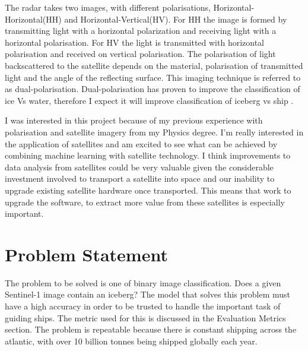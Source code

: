 \documentclass{article}
\begin{document}
The radar takes two images, with different polarisations,  Horizontal-Horizontal(HH) and Horizontal-Vertical(HV). For HH the image is formed by transmitting light with a horizontal polarization and receiving light with a horizontal polarisation. For HV the light is transmitted with horizontal polarisation and received on vertical polarisation. The polarisation of light backscattered to the satellite depends on the material, polarisation of transmitted light and the angle of the reflecting surface. This imaging technique is referred to as dual-polarisation. Dual-polarisation has proven to improve the classification of ice Vs water, therefore I expect it will improve classification of iceberg vs ship \cite{radarsat-mode-selection,yu}. 

I was interested in this project because of my previous experience with polarisation and satellite imagery from my Physics degree. I'm really interested in the application of satellites and am excited to see what can be achieved by combining machine learning with satellite technology. I think improvements to data analysis from satellites could be very valuable given the considerable investment involved to transport a satellite into space and our inability to upgrade existing satellite hardware once transported. This means that work to upgrade the software, to extract more value from these satellites is especially important.  



\section{Problem Statement}
The problem to be solved is one of binary image classification. Does a given Sentinel-1 image contain an iceberg? The model that solves this problem must have a high accuracy in order to be trusted to handle the important task of guiding ships. The metric used for this is discussed in the Evaluation Metrics section. The problem is repeatable because there is constant shipping across the atlantic, with over 10 billion tonnes being shipped globally each year. \cite{unctad}
\end{document}
